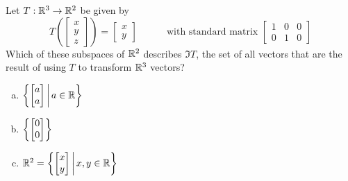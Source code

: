 \begin{activity}{5}
Let \(T: \mathbb{R}^3 \rightarrow \mathbb{R}^2\) be given by
\[
  T\left(\begin{bmatrix}x \\ y\\z \end{bmatrix} \right)
    =
  \begin{bmatrix} x \\ y \end{bmatrix}
    \hspace{3em}
    \text{with standard matrix }
  \begin{bmatrix} 1 & 0 & 0 \\ 0 & 1 & 0 \end{bmatrix}
\]
Which of these subspaces of \(\mathbb{R}^2\) describes \(\Im T\),
the set of all vectors that are the result of using \(T\) to transform
\(\mathbb{R}^3\) vectors?
\begin{enumerate}[a)]
\item \(\left\{\begin{bmatrix}a \\ a\end{bmatrix}\,\middle|\,a\in\mathbb{R}\right\}\)
\item \(\left\{\begin{bmatrix}0\\0\end{bmatrix}\right\}\)
\item \(\mathbb{R}^2=\left\{\begin{bmatrix}x \\ y\end{bmatrix}\,\middle|\,x,y\in\mathbb{R}\right\}\)
\end{enumerate}
\end{activity}


